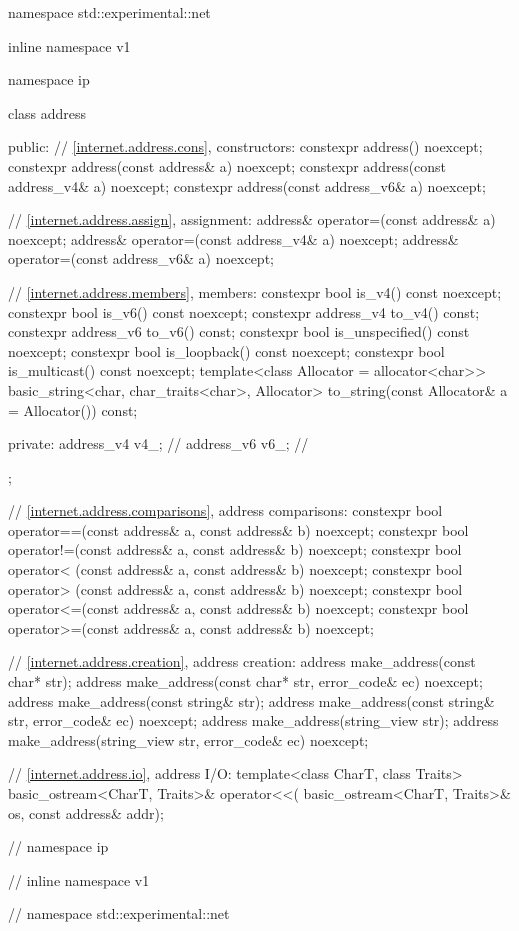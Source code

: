 %
%
%
%
%
%
%
%
%
\begin{codeblock}
namespace std::experimental::net {
inline namespace v1 {
namespace ip {

  class address
  {
  public:
    // \ref{internet.address.cons}, constructors:
    constexpr address() noexcept;
    constexpr address(const address& a) noexcept;
    constexpr address(const address_v4& a) noexcept;
    constexpr address(const address_v6& a) noexcept;

    // \ref{internet.address.assign}, assignment:
    address& operator=(const address& a) noexcept;
    address& operator=(const address_v4& a) noexcept;
    address& operator=(const address_v6& a) noexcept;

    // \ref{internet.address.members}, members:
    constexpr bool is_v4() const noexcept;
    constexpr bool is_v6() const noexcept;
    constexpr address_v4 to_v4() const;
    constexpr address_v6 to_v6() const;
    constexpr bool is_unspecified() const noexcept;
    constexpr bool is_loopback() const noexcept;
    constexpr bool is_multicast() const noexcept;
    template<class Allocator = allocator<char>>
      basic_string<char, char_traits<char>, Allocator>
        to_string(const Allocator& a = Allocator()) const;

  private:
    address_v4 v4_; // \expos
    address_v6 v6_; // \expos
  };

  // \ref{internet.address.comparisons}, address comparisons:
  constexpr bool operator==(const address& a, const address& b) noexcept;
  constexpr bool operator!=(const address& a, const address& b) noexcept;
  constexpr bool operator< (const address& a, const address& b) noexcept;
  constexpr bool operator> (const address& a, const address& b) noexcept;
  constexpr bool operator<=(const address& a, const address& b) noexcept;
  constexpr bool operator>=(const address& a, const address& b) noexcept;

  // \ref{internet.address.creation}, address creation:
  address make_address(const char* str);
  address make_address(const char* str, error_code& ec) noexcept;
  address make_address(const string& str);
  address make_address(const string& str, error_code& ec) noexcept;
  address make_address(string_view str);
  address make_address(string_view str, error_code& ec) noexcept;

  // \ref{internet.address.io}, address I/O:
  template<class CharT, class Traits>
    basic_ostream<CharT, Traits>& operator<<(
      basic_ostream<CharT, Traits>& os, const address& addr);

} // namespace ip
} // inline namespace v1
} // namespace std::experimental::net
\end{codeblock}

